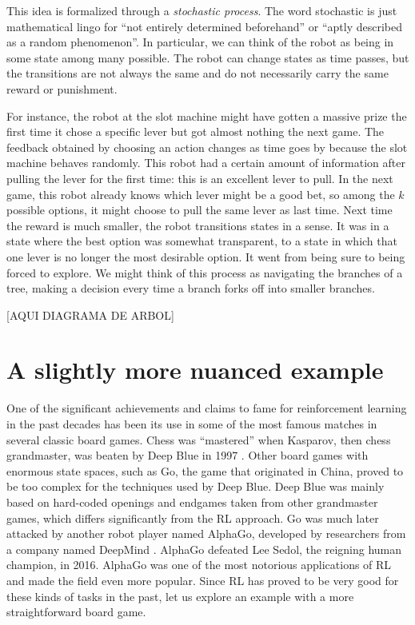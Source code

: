 This idea is formalized through a \textit{stochastic process}. The word
stochastic is just mathematical lingo for ``not entirely determined beforehand''
or ``aptly described as a random phenomenon''. In particular, we can think of
the robot as being in some state among many possible. The robot can change
states as time passes, but the transitions are not always the same and do not
necessarily carry the same reward or punishment.

For instance, the robot at the slot machine might have gotten a massive prize
the first time it chose a specific lever but got almost nothing the next game.
The feedback obtained by choosing an action changes as time goes by because the
slot machine behaves randomly. This robot had a certain amount of information
after pulling the lever for the first time: this is an excellent lever to pull.
In the next game, this robot already knows which lever might be a good bet, so
among the $k$ possible options, it might choose to pull the same lever as last
time. Next time the reward is much smaller, the robot transitions states in a
sense. It was in a state where the best option was somewhat transparent, to a
state in which that one lever is no longer the most desirable option. It went
from being sure to being forced to explore. We might think of this process as
navigating the branches of a tree, making a decision every time a branch forks
off into smaller branches.

[AQUI DIAGRAMA DE ARBOL]

\section{A slightly more nuanced example}
One of the significant achievements and claims to fame for reinforcement
learning in the past decades has been its use in some of the most famous matches
in several classic board games. Chess was ``mastered'' when Kasparov, then chess
grandmaster, was beaten by Deep Blue in 1997 \cite{silverchess}. Other board
games with enormous state spaces, such as Go, the game that originated in China,
proved to be too complex for the techniques used by Deep Blue. Deep Blue was
mainly based on hard-coded openings and endgames taken from other grandmaster
games, which differs significantly from the RL approach. Go was much later
attacked by another robot player named AlphaGo, developed by researchers from a
company named DeepMind \cite{silver2017mastering}. AlphaGo defeated Lee Sedol,
the reigning human champion, in 2016. AlphaGo was one of the most notorious
applications of RL and made the field even more popular. Since RL has proved to
be very good for these kinds of tasks in the past, let us explore an example
with a more straightforward board game.

